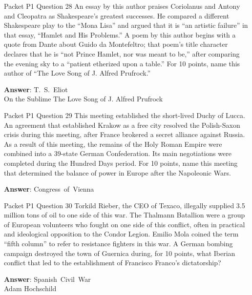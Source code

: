 \begin{frame}{Packet P1 Question 28}
An essay by this author praises Coriolanus   and Antony and Cleopatra as Shakespeare's greatest successes. He compared a different Shakespeare play to the ``Mona Lisa'' and argued that it is ``an artistic failure'' in that essay, ``Hamlet and His Problems.'' A poem by this author begins with a quote from Dante about Guido da Montefeltro; that poem's title character declares that he is ``not Prince Hamlet, nor was meant to be,'' after comparing the evening sky to a ``patient   etherized upon a table.'' For 10 points,     name this author of ``The Love Song   of J. Alfred Prufrock.''

\textbf{Answer}: T.\ S.\ Eliot\\
 On the Sublime
 The Love Song of J. Alfred Prufrock
\end{frame}

\begin{frame}{Packet P1 Question 29}
This meeting established the short-lived Duchy of Lucca. An agreement     that established Krakow as a free city resolved the     Polish-Saxon crisis during this meeting, after France brokered a secret alliance against Russia. As a result of this meeting, the remains of the Holy Roman Empire were combined into a 39-state German Confederation. Its main negotiations were completed during the Hundred Days period. For 10 points, name this meeting that determined the balance of power in Europe after the Napoleonic Wars.

\textbf{Answer}: Congress\ of\ Vienna\\
\end{frame}

\begin{frame}{Packet P1 Question 30}
Torkild Rieber, the CEO   of Texaco, illegally supplied 3.5 million tons of oil to one side of this war. The Thalmann Batallion were a group of European volunteers who fought on one side of this conflict, often in practical and ideological opposition to the Condor Legion. Emilio Mola   coined the term ``fifth   column'' to refer   to resistance fighters in this war. A German bombing campaign destroyed the town of Guernica during,   for 10 points, what Iberian conflict that led to the establishment of Francisco Franco’s dictatorship?

\textbf{Answer}: Spanish\ Civil\ War\\
 Adam Hochschild
\end{frame}

